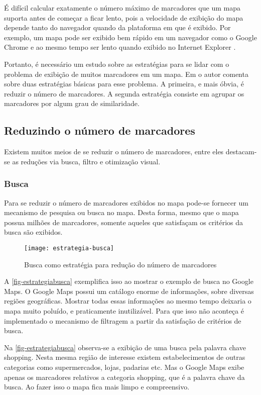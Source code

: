 	É difícil calcular exatamente o número máximo de marcadores que um mapa suporta antes de começar a ficar lento, pois a velocidade de exibição do mapa depende tanto do navegador quando da plataforma em que é exibido. Por exemplo, um mapa pode ser exibido bem rápido em um navegador como o Google Chrome e ao mesmo tempo ser lento quando exibido no Internet Explorer   \cite[p. 177]{livroGoogleApiV3}.
	
    Portanto, é necessário um estudo sobre as  estratégias para se lidar com o problema de exibição de muitos marcadores em um mapa. Em \cite[capítulo~9]{livroGoogleApiV3} o autor comenta sobre duas estratégias básicas para esse problema. A primeira, e mais óbvia, é reduzir o número de marcadores. A segunda estratégia consiste em agrupar os marcadores por algum grau de similaridade.
    
  \subsection{Reduzindo o número de marcadores}
  Existem muitos meios de se reduzir o número de marcadores, entre eles destacam-se as reduções via busca, filtro e otimização visual.
	\subsubsection{Busca}
	Para se reduzir  o número de marcadores exibidos no mapa pode-se fornecer um mecanismo de pesquisa ou busca no mapa. Desta forma, mesmo que o mapa possua milhões de marcadores, somente aqueles que satisfaçam os critérios da busca são exibidos.
	
	 \begin{figure}[htb]
	\caption{\label{fig-estrategiabusca}Busca como estratégia para redução do número de marcadores}
	\begin{center}
	    \texttt{[image: estrategia-busca]}
	\end{center}
	\end{figure}
	 
	 A \autoref{fig-estrategiabusca}  exemplifica isso ao mostrar o exemplo de busca no Google Maps. O Google Maps possui um catálogo enorme de informações, sobre diversas regiões geográficas. Mostrar todas essas informações ao mesmo tempo deixaria o mapa muito poluído, e praticamente inutilizável. Para que isso não aconteça é implementado o mecanismo de filtragem a partir da satisfação de critérios de busca.
	
	 Na \autoref{fig-estrategiabusca} observa-se a exibição de uma busca pela palavra chave shopping. Nesta mesma região de interesse existem estabelecimentos de outras categorias como supermercados, lojas, padarias etc. Mas o Google Maps exibe apenas os marcadores relativos a categoria shopping, que é a palavra chave da busca. Ao fazer isso o mapa fica mais limpo e compreensivo.
	 
